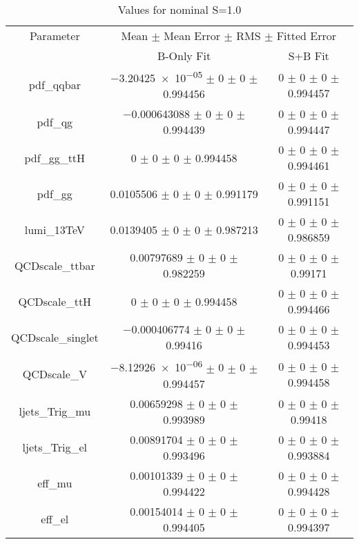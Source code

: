 \begin{table}
\centering
\caption{Values for nominal S=1.0}
\begin{tabular}{ccc}
\toprule
Parameter 	& \multicolumn{2}{c}{Mean $\pm$ Mean Error $\pm$ RMS $\pm$ Fitted Error}\\
 	& B-Only Fit & S+B Fit\\
\midrule
pdf\_qqbar 	& \num{-3.20425e-05} $\pm$ \num{0} $\pm$ \num{0} $\pm$ \num{0.994456} 	& \num{0} $\pm$ \num{0} $\pm$ \num{0} $\pm$ \num{0.994457}\\
pdf\_qg 	& \num{-0.000643088} $\pm$ \num{0} $\pm$ \num{0} $\pm$ \num{0.994439} 	& \num{0} $\pm$ \num{0} $\pm$ \num{0} $\pm$ \num{0.994447}\\
pdf\_gg\_ttH 	& \num{0} $\pm$ \num{0} $\pm$ \num{0} $\pm$ \num{0.994458} 	& \num{0} $\pm$ \num{0} $\pm$ \num{0} $\pm$ \num{0.994461}\\
pdf\_gg 	& \num{0.0105506} $\pm$ \num{0} $\pm$ \num{0} $\pm$ \num{0.991179} 	& \num{0} $\pm$ \num{0} $\pm$ \num{0} $\pm$ \num{0.991151}\\
lumi\_13TeV 	& \num{0.0139405} $\pm$ \num{0} $\pm$ \num{0} $\pm$ \num{0.987213} 	& \num{0} $\pm$ \num{0} $\pm$ \num{0} $\pm$ \num{0.986859}\\
QCDscale\_ttbar 	& \num{0.00797689} $\pm$ \num{0} $\pm$ \num{0} $\pm$ \num{0.982259} 	& \num{0} $\pm$ \num{0} $\pm$ \num{0} $\pm$ \num{0.99171}\\
QCDscale\_ttH 	& \num{0} $\pm$ \num{0} $\pm$ \num{0} $\pm$ \num{0.994458} 	& \num{0} $\pm$ \num{0} $\pm$ \num{0} $\pm$ \num{0.994466}\\
QCDscale\_singlet 	& \num{-0.000406774} $\pm$ \num{0} $\pm$ \num{0} $\pm$ \num{0.99416} 	& \num{0} $\pm$ \num{0} $\pm$ \num{0} $\pm$ \num{0.994453}\\
QCDscale\_V 	& \num{-8.12926e-06} $\pm$ \num{0} $\pm$ \num{0} $\pm$ \num{0.994457} 	& \num{0} $\pm$ \num{0} $\pm$ \num{0} $\pm$ \num{0.994458}\\
ljets\_Trig\_mu 	& \num{0.00659298} $\pm$ \num{0} $\pm$ \num{0} $\pm$ \num{0.993989} 	& \num{0} $\pm$ \num{0} $\pm$ \num{0} $\pm$ \num{0.99418}\\
ljets\_Trig\_el 	& \num{0.00891704} $\pm$ \num{0} $\pm$ \num{0} $\pm$ \num{0.993496} 	& \num{0} $\pm$ \num{0} $\pm$ \num{0} $\pm$ \num{0.993884}\\
eff\_mu 	& \num{0.00101339} $\pm$ \num{0} $\pm$ \num{0} $\pm$ \num{0.994422} 	& \num{0} $\pm$ \num{0} $\pm$ \num{0} $\pm$ \num{0.994428}\\
eff\_el 	& \num{0.00154014} $\pm$ \num{0} $\pm$ \num{0} $\pm$ \num{0.994405} 	& \num{0} $\pm$ \num{0} $\pm$ \num{0} $\pm$ \num{0.994397}\\

\end{tabular}
\end{table}

